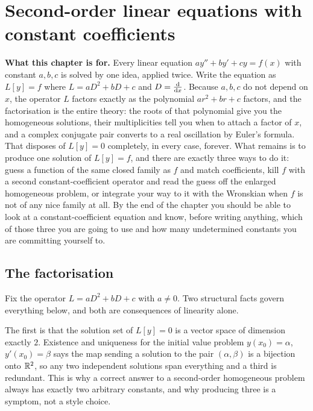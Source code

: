 \chapter{Second-order linear equations with constant coefficients}

\begin{orient}
\textbf{What this chapter is for.} Every linear equation $ay''+by'+cy=f(x)$ with constant $a,b,c$ is solved by one idea, applied twice. Write the equation as $L[y]=f$ where $L=aD^{2}+bD+c$ and $D=\frac{\mathrm{d}}{\mathrm{d}x}$. Because $a,b,c$ do not depend on $x$, the operator $L$ factors exactly as the polynomial $a r^{2}+br+c$ factors, and the factorisation is the entire theory: the roots of that polynomial give you the homogeneous solutions, their multiplicities tell you when to attach a factor of $x$, and a complex conjugate pair converts to a real oscillation by Euler's formula. That disposes of $L[y]=0$ completely, in every case, forever. What remains is to produce one solution of $L[y]=f$, and there are exactly three ways to do it: guess a function of the same closed family as $f$ and match coefficients, kill $f$ with a second constant-coefficient operator and read the guess off the enlarged homogeneous problem, or integrate your way to it with the Wronskian when $f$ is not of any nice family at all. By the end of the chapter you should be able to look at a constant-coefficient equation and know, before writing anything, which of those three you are going to use and how many undetermined constants you are committing yourself to.
\end{orient}

\section{The factorisation}

Fix the operator $L=aD^{2}+bD+c$ with $a\ne0$. Two structural facts govern everything below, and both are consequences of linearity alone.

The first is that the solution set of $L[y]=0$ is a vector space of dimension exactly $2$. Existence and uniqueness for the initial value problem $y(x_0)=\alpha$, $y'(x_0)=\beta$ says the map sending a solution to the pair $(\alpha,\beta)$ is a bijection onto $\mathbb{R}^{2}$, so any two independent solutions span everything and a third is redundant. This is why a correct answer to a second-order homogeneous problem always has exactly two arbitrary constants, and why producing three is a symptom, not a style choice.

